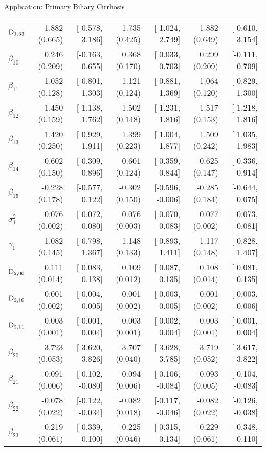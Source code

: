 \begin{chapter}{\label{cha:app-PBC}Application: Primary Biliary Cirrhosis}
\begin{table}[ht]
\begin{tabular}{lrrrrrr}
    $\mathrm{D}_{1,33}$ & 1.882 (0.665) & [ 0.578, 3.186] & 1.735 (0.425) & [ 1.024, 2.749] & 1.882 (0.649) & [ 0.610, 3.154] \\ 
    $\beta_{10}$ &  0.246 (0.209) & [-0.163, 0.655] &  0.368 (0.170) & [ 0.033,  0.703] &  0.299 (0.209) & [-0.111, 0.709] \\ 
    $\beta_{11}$ &  1.052 (0.128) & [ 0.801, 1.303] &  1.121 (0.124) & [ 0.881,  1.369] &  1.064 (0.120) & [ 0.829, 1.300] \\ 
    $\beta_{12}$ &  1.450 (0.159) & [ 1.138, 1.762] &  1.502 (0.148) & [ 1.231,  1.816] &  1.517 (0.153) & [ 1.218, 1.816] \\ 
    $\beta_{13}$ &  1.420 (0.250) & [ 0.929, 1.911] &  1.399 (0.223) & [ 1.004,  1.877] &  1.509 (0.242) & [ 1.035, 1.983] \\ 
    $\beta_{14}$ &  0.602 (0.150) & [ 0.309, 0.896] &  0.601 (0.124) & [ 0.359,  0.844] &  0.625 (0.147) & [ 0.336, 0.914] \\ 
    $\beta_{15}$ & -0.228 (0.178) & [-0.577, 0.122] & -0.302 (0.150) & [-0.596, -0.006] & -0.285 (0.184) & [-0.644, 0.075] \\ 
    $\sigma^2_1$ &  0.076 (0.002) & [ 0.072, 0.080] &  0.076 (0.003) & [ 0.070,  0.083] &  0.077 (0.002) & [ 0.073, 0.081] \\ 
    $\gamma_1$ &  1.082 (0.145) & [ 0.798, 1.367] &  1.148 (0.133) & [ 0.893,  1.411] &  1.117 (0.148) & [ 0.828, 1.407] \\   
    \hdashline
    $\mathrm{D}_{2,00}$ & 0.111 (0.014) & [ 0.083, 0.138] & 0.109 (0.012) & [ 0.087, 0.135] & 0.108 (0.014) & [ 0.081, 0.135] \\ 
    $\mathrm{D}_{2,10}$ & 0.001 (0.002) & [-0.004, 0.005] & 0.001 (0.002) & [-0.003, 0.005] & 0.001 (0.002) & [-0.003, 0.006] \\ 
    $\mathrm{D}_{2,11}$ & 0.003 (0.001) & [ 0.001, 0.004] & 0.003 (0.001) & [ 0.002, 0.004] & 0.003 (0.001) & [ 0.001, 0.004] \\ 
    $\beta_{20}$ &  3.723 (0.053) & [ 3.620,  3.826] &  3.707 (0.040) & [ 3.628,  3.785] &  3.719 (0.052) & [ 3.617,  3.822] \\ 
    $\beta_{21}$ & -0.091 (0.006) & [-0.102, -0.080] & -0.094 (0.006) & [-0.106, -0.084] & -0.093 (0.005) & [-0.104, -0.083] \\ 
    $\beta_{22}$ & -0.078 (0.022) & [-0.122, -0.034] & -0.082 (0.018) & [-0.117, -0.046] & -0.082 (0.022) & [-0.126, -0.038] \\ 
    $\beta_{23}$ & -0.219 (0.061) & [-0.339, -0.100] & -0.225 (0.046) & [-0.315, -0.134] & -0.229 (0.061) & [-0.348, -0.110] \\ 

\end{tabular}
\end{table}
\end{chapter}
